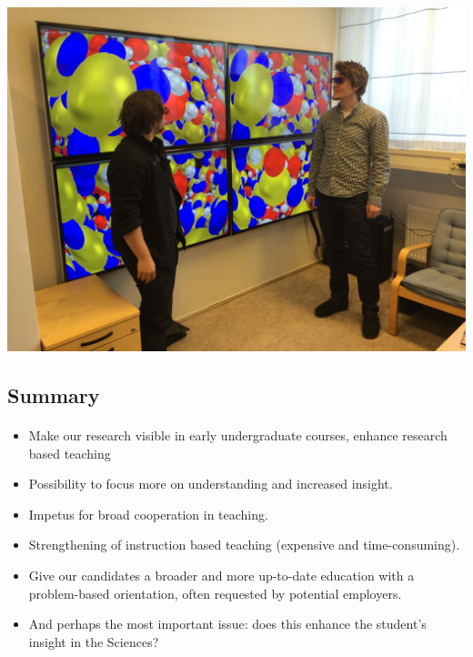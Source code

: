 \documentclass[%
twoside,                 %
final,                   %
10pt]{article}
\begin{document}
\centerline{\includegraphics[width=0.7\linewidth]{figures/visualize.jpg}}







\subsection{Summary}

\paragraph{}

\begin{itemize}
\item Make our research visible in early undergraduate courses, enhance research based teaching

\item Possibility to focus more on understanding and increased insight.

\item Impetus for broad cooperation in teaching.

\item Strengthening of instruction based teaching (expensive and time-consuming).

\item Give our candidates a broader and more up-to-date education with a problem-based orientation, often requested by potential employers.

\item And perhaps the most important issue: does this enhance the student's insight in the Sciences?
\end{itemize}
\end{document}
